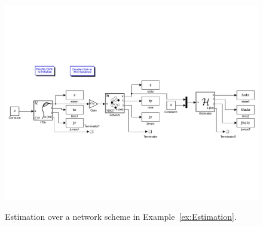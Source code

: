 \label{ex:EstimationOverNetwork}
\begin{figure}
  \begin{center}
    {\includegraphics[width=1.0\textwidth]{figures/Simulink/NetworkExample.pdf}}
   \caption{Estimation over a network scheme in Example~\ref{ex:Estimation}.}
\label{fig:NetworkExample}
  \end{center}
\end{figure}

